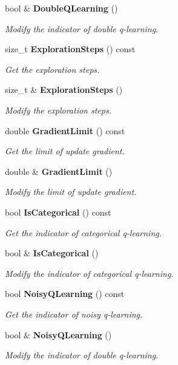 \begin{DoxyCompactItemize}
bool \& \textbf{ Double\+Q\+Learning} ()
\begin{DoxyCompactList}\small\item\em Modify the indicator of double q-\/learning. \end{DoxyCompactList}\item 
size\+\_\+t \textbf{ Exploration\+Steps} () const
\begin{DoxyCompactList}\small\item\em Get the exploration steps. \end{DoxyCompactList}\item 
size\+\_\+t \& \textbf{ Exploration\+Steps} ()
\begin{DoxyCompactList}\small\item\em Modify the exploration steps. \end{DoxyCompactList}\item 
double \textbf{ Gradient\+Limit} () const
\begin{DoxyCompactList}\small\item\em Get the limit of update gradient. \end{DoxyCompactList}\item 
double \& \textbf{ Gradient\+Limit} ()
\begin{DoxyCompactList}\small\item\em Modify the limit of update gradient. \end{DoxyCompactList}\item 
bool \textbf{ Is\+Categorical} () const
\begin{DoxyCompactList}\small\item\em Get the indicator of categorical q-\/learning. \end{DoxyCompactList}\item 
bool \& \textbf{ Is\+Categorical} ()
\begin{DoxyCompactList}\small\item\em Modify the indicator of categorical q-\/learning. \end{DoxyCompactList}\item 
bool \textbf{ Noisy\+Q\+Learning} () const
\begin{DoxyCompactList}\small\item\em Get the indicator of noisy q-\/learning. \end{DoxyCompactList}\item 
bool \& \textbf{ Noisy\+Q\+Learning} ()
\begin{DoxyCompactList}\small\item\em Modify the indicator of double q-\/learning. \end{DoxyCompactList}\item 

\end{DoxyCompactItemize}
